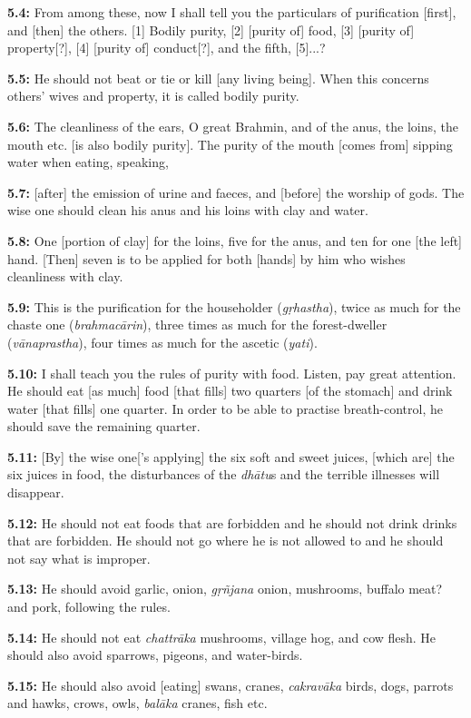 \documentclass{article}
\newcommand{\vsnum}[1]{\textbf{#1}}
\newcommand{\skt}[1]{\textit{#1}}
\begin{document}
\vsnum{5.4: }From among these, now I shall tell you the particulars of purification [first], and [then] the others. [1] Bodily purity, [2] [purity of] food, [3] [purity of] property[?], [4] [purity of] conduct[?], and the fifth, [5]...?

\vsnum{5.5: }He should not beat or tie or kill [any living being]. When this concerns others' wives and property, it is called bodily purity.

\vsnum{5.6: }The cleanliness of the ears, O great Brahmin, and of the anus, the loins, the mouth etc. [is also bodily purity]. The purity of the mouth [comes from] sipping water when eating, speaking,

\vsnum{5.7: }[after] the emission of urine and faeces, and [before] the worship of gods. The wise one should clean his anus and his loins with clay and water.

\vsnum{5.8: }One [portion of clay] for the loins, five for the anus, and ten for one [the left] hand. [Then] seven is to be applied for both [hands] by him who wishes cleanliness with clay.

\vsnum{5.9: }This is the purification for the householder (\skt{gṛhastha}), twice as much for the chaste one (\skt{brahmacārin}), three times as much for the forest-dweller (\skt{vānaprastha}), four times as much for the ascetic (\skt{yati}).

\vsnum{5.10: }I shall teach you the rules of purity with food. Listen, pay great attention. He should eat [as much] food [that fills] two quarters [of the stomach] and drink water [that fills] one quarter. In order to be able to practise breath-control, he should save the remaining quarter.

\vsnum{5.11: }[By] the wise one['s applying] the six soft and sweet juices, [which are] the six juices in food, the disturbances of the \skt{dhātu}s and the terrible illnesses will disappear.

\vsnum{5.12: }He should not eat foods that are forbidden and he should not drink drinks that are forbidden. He should not go where he is not allowed to and he should not say what is improper.

\vsnum{5.13: }He should avoid garlic, onion, \skt{gṛñjana} onion, mushrooms, buffalo meat? and pork, following the rules.

\vsnum{5.14: }He should not eat \skt{chattrāka} mushrooms, village hog, and cow flesh. He should also avoid sparrows, pigeons, and water-birds.

\vsnum{5.15: }He should also avoid [eating] swans, cranes, \skt{cakravāka} birds, dogs, parrots and hawks, crows, owls, \skt{balāka} cranes, fish etc.
\end{document}
